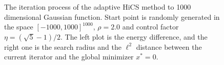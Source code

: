 \documentclass[final,1p,times]{elsarticle}
\begin{document}
\begin{figure}[!htbp]
\begin{minipage}[b]{0.5\linewidth}
{	  }
	\end{minipage}
	  \caption{The iteration process of the adaptive HiCS method to 1000
	  dimensional Gaussian function. 
	  Start point is randomly generated in the space $[-1000,
	  1000]^{1000}$, $\rho=2.0$ and control factor
	  $\eta=(\sqrt{5}-1)/2$. The left plot is the energy
	  difference, and the right one is the search radius and 
	  the $\ell^2$ distance between the current iterator and the
	  global minimizer $x^*=0$.
	  } 
	  \label{fig:gauss:1000D}
\end{figure}

\end{document}
